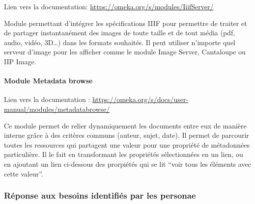 Lien vers la documentation: \url{https://omeka.org/s/modules/IiifServer/}

Module permettant d’intégrer les spécifications IIIF pour permettre de traiter et de partager instantanément des images de toute taille et de tout média (pdf, audio, vidéo, 3D…) dans les formats souhaités. Il peut utiliser n’importe quel serveur d’image pour les afficher comme le module Image Server, Cantaloupe ou IIP Image. 

\paragraph*{Module Metadata browse}

Lien vers la documentation : \url{https://omeka.org/s/docs/user-manual/modules/metadatabrowse/}

Ce module permet de relier dynamiquement les documents entre eux de manière interne grâce à des critères communs (auteur, sujet, date).
Il permet de parcourir toutes les ressources qui partagent une valeur pour une propriété de métadonnées particulière. Il le fait en transformant les propriétés sélectionnées en un lien, ou en ajoutant un lien ci-dessous des prorpiétés qui se lit \enquote{voir tous les éléments avec cette valeur}.

\subsubsection{Réponse aux besoins identifiés par les personae}

